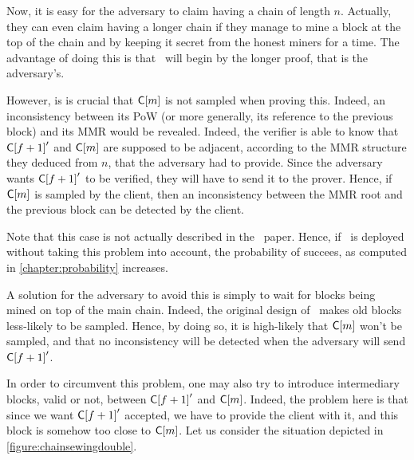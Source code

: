       Now, it is easy for the adversary to claim having a chain of length \(n\). Actually, they can even claim having a longer chain if they manage to mine a block at the top of the chain and by keeping it secret from the honest miners for a time. The advantage of doing this is that \FC\ will begin by the longer proof, that is the adversary's.
      
      However, is is crucial that \(\mathsf{C[}m\mathsf{]}\) is not sampled when proving this. Indeed, an inconsistency between its PoW (or more generally, its reference to the previous block) and its MMR would be revealed. Indeed, the verifier is able to know that \(\mathsf{C[}f+1\mathsf{]}'\) and \(\mathsf{C[}m\mathsf{]}\) are supposed to be adjacent, according to the MMR structure they deduced from \(n\), that the adversary had to provide. Since the adversary wants \(\mathsf{C[}f+1\mathsf{]}'\) to be verified, they will have to send it to the prover. Hence, if \(\mathsf{C[}m\mathsf{]}\) is sampled by the client, then an inconsistency between the MMR root and the previous block can be detected by the client.
      
      Note that this case is not actually described in the \FC\ paper. Hence, if \FC\ is deployed without taking this problem into account, the probability of succees, as computed in \autoref{chapter:probability} increases. 
      
      A solution for the adversary to avoid this is simply to wait for blocks being mined on top of the main chain. Indeed, the original design of \FC\ makes old blocks less-likely to be sampled. Hence, by doing so, it is high-likely that \(\mathsf{C[}m\mathsf{]}\) won't be sampled, and that no inconsistency will be detected when the adversary will send \(\mathsf{C[}f+1\mathsf{]}'\).
      
      In order to circumvent this problem, one may also try to introduce intermediary blocks, valid or not, between \(\mathsf{C[}f+1\mathsf{]}'\) and \(\mathsf{C[}m\mathsf{]}\). Indeed, the problem here is that since we want \(\mathsf{C[}f+1\mathsf{]}'\) accepted, we have to provide the client with it, and this block is somehow too close to \(\mathsf{C[}m\mathsf{]}\). Let us consider the situation depicted in \autoref{figure:chainsewingdouble}.
      
